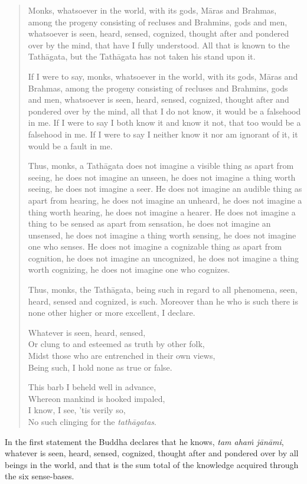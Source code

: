 \begin{quote}
Monks, whatsoever in the world, with its gods, Māras and Brahmas, among the progeny consisting of recluses and Brahmins, gods and men, whatsoever is seen, heard, sensed, cognized, thought after and pondered over by the mind, that have I fully understood. All that is known to the Tathāgata, but the Tathāgata has not taken his stand upon it.

If I were to say, monks, whatsoever in the world, with its gods, Māras and Brahmas, among the progeny consisting of recluses and Brahmins, gods and men, whatsoever is seen, heard, sensed, cognized, thought after and pondered over by the mind, all that I do not know, it would be a falsehood in me. If I were to say I both know it and know it not, that too would be a falsehood in me. If I were to say I neither know it nor am ignorant of it, it would be a fault in me.

Thus, monks, a Tathāgata does not imagine a visible thing as apart from seeing, he does not imagine an unseen, he does not imagine a thing worth seeing, he does not imagine a seer. He does not imagine an audible thing as apart from hearing, he does not imagine an unheard, he does not imagine a thing worth hearing, he does not imagine a hearer. He does not imagine a thing to be sensed as apart from sensation, he does not imagine an unsensed, he does not imagine a thing worth sensing, he does not imagine one who senses. He does not imagine a cognizable thing as apart from cognition, he does not imagine an uncognized, he does not imagine a thing worth cognizing, he does not imagine one who cognizes.

Thus, monks, the Tathāgata, being such in regard to all phenomena, seen, heard, sensed and cognized, is such. Moreover than he who is such there is none other higher or more excellent, I declare.

Whatever is seen, heard, sensed,\\
Or clung to and esteemed as truth by other folk,\\
Midst those who are entrenched in their own views,\\
Being such, I hold none as true or false.

This barb I beheld well in advance,\\
Whereon mankind is hooked impaled,\\
I know, I see, 'tis verily so,\\
No such clinging for the \emph{tathāgatas}.
\end{quote}

In the first statement the Buddha declares that he knows, \emph{tam ahaṁ jānāmi}, whatever is seen, heard, sensed, cognized, thought after and pondered over by all beings in the world, and that is the sum total of the knowledge acquired through the six sense-bases.

